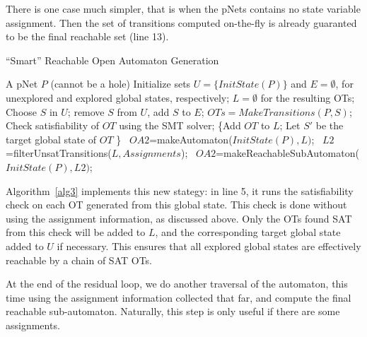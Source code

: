 \documentclass[smallcondensed]{svjour3}
\begin{document}
There is one case much simpler, that is when the pNets contains no
state variable assignment. Then the set of transitions computed
on-the-fly is already guaranted to be the final reachable set (line 13).
 
\begin{algorithm}[h]
  \caption{``Smart'' Reachable Open Automaton Generation}
  \label{alg3}
\begin{algorithmic}[1]
\Require A pNet $P$ (cannot be a hole)
\State Initialize sets $U=\{\mathit{InitState}(P)\}$ and $E=\emptyset$,
for unexplored and explored global states, respectively; $L=\emptyset$ for the resulting OTs;
	\State Choose $S$ in $U$; remove $S$ from $U$, add $S$ to $E$;
	\State $\mathit{OTs} = \mathit{MakeTransitions}(P, S)$;
        Check satisfiability of $\mathit{OT}$ using the SMT solver;
                {\State \{Add $\mathit{OT}$ to $L$;
                  \State Let $S'$ be the target global state of $\mathit{OT}$
                  \}}
	\EndFor
\EndWhile
        {\State \quad\ \Return $\mathit{OA2}$=makeAutomaton($\mathit{InitState}(P),L)$;}
        {\State \quad\ $\mathit{L2}$=filterUnsatTransitions($\mathit{L,Assignments}$);
         \State \quad\ \Return $\mathit{OA2}$=makeReachableSubAutomaton($\mathit{InitState}(P),L2)$};
\end{algorithmic}  
\end{algorithm}

Algorithm~\ref{alg3} implements this new stategy: in line 5, it runs
the satisfiability check on each OT generated from this global
state. This check is done without using the assignment information, as
discussed above. Only the OTs found SAT from this check will be added
to $L$, and the corresponding target global state added to $U$ if
necessary. This ensures that all explored global states are
effectively reachable by a chain of SAT OTs.

At the end of the residual loop, we do another traversal of the
automaton, this time using the assignment information collected that
far, and compute the final reachable sub-automaton. 
Naturally, this step is only useful if there are some assignments.
\end{document}
